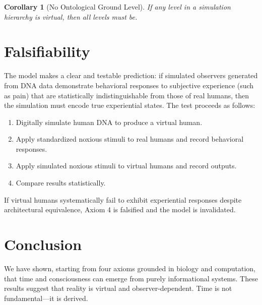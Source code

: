 \documentclass[11pt]{article}
\newtheorem{corollary}{Corollary}
\begin{document}
\begin{corollary}[No Ontological Ground Level]
If any level in a simulation hierarchy is virtual, then all levels must be.
\end{corollary}

\section{Falsifiability}
The model makes a clear and testable prediction: if simulated observers generated from DNA data demonstrate behavioral responses to subjective experience (such as pain) that are statistically indistinguishable from those of real humans, then the simulation must encode true experiential states. The test proceeds as follows:

\begin{enumerate}
  \item Digitally simulate human DNA to produce a virtual human.
  \item Apply standardized noxious stimuli to real humans and record behavioral responses.
  \item Apply simulated noxious stimuli to virtual humans and record outputs.
  \item Compare results statistically.
\end{enumerate}

If virtual humans systematically fail to exhibit experiential responses despite architectural equivalence, Axiom 4 is falsified and the model is invalidated.

\section{Conclusion}

We have shown, starting from four axioms grounded in biology and computation, that time and consciousness can emerge from purely informational systems. These results suggest that reality is virtual and observer-dependent. Time is not fundamental—it is derived.

\printbibliography
\end{document}
